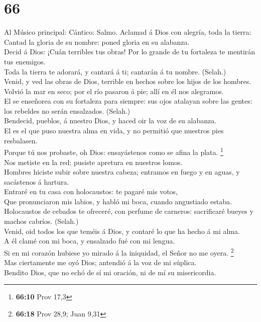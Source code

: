 \hypertarget{section-65}{%
\section{66}\label{section-65}}

 Al Músico principal: Cántico: Salmo. Aclamad á Dios con
alegría, toda la tierra:\\
 Cantad la gloria de su nombre: poned gloria en su
alabanza.\\
 Decid á Dios: ¡Cuán terribles tus obras! Por lo grande de
tu fortaleza te mentirán tus enemigos.\\
 Toda la tierra te adorará, y cantará á ti; cantarán á tu
nombre. (Selah.)\\
 Venid, y ved las obras de Dios, terrible en hechos sobre
los hijos de los hombres.\\
 Volvió la mar en seco; por el río pasaron á pie; allí en
él nos alegramos.\\
 El se enseñorea con su fortaleza para siempre: sus ojos
atalayan sobre las gentes: los rebeldes no serán ensalzados. (Selah.)\\
 Bendecid, pueblos, á nuestro Dios, y haced oir la voz de
su alabanza.\\
 El es el que puso nuestra alma en vida, y no permitió que
nuestros pies resbalasen.\\
 Porque tú nos probaste, oh Dios: ensayástenos como se
afina la plata. \footnote{\textbf{66:10} Prov 17,3}\\
 Nos metiste en la red; pusiste apretura en nuestros
lomos.\\
 Hombres hiciste subir sobre nuestra cabeza; entramos en
fuego y en aguas, y sacástenos á hartura.\\
 Entraré en tu casa con holocaustos: te pagaré mis
votos,\\
 Que pronunciaron mis labios, y habló mi boca, cuando
angustiado estaba.\\
 Holocaustos de cebados te ofreceré, con perfume de
carneros: sacrificaré bueyes y machos cabríos. (Selah.)\\
 Venid, oid todos los que teméis á Dios, y contaré lo que
ha hecho á mi alma.\\
 A él clamé con mi boca, y ensalzado fué con mi lengua.\\
 Si en mi corazón hubiese yo mirado á la iniquidad, el
Señor no me oyera. \footnote{\textbf{66:18} Prov 28,9; Juan 9,31}\\
 Mas ciertamente me oyó Dios; antendió á la voz de mi
súplica.\\
 Bendito Dios, que no echó de sí mi oración, ni de mí su
misericordia.

